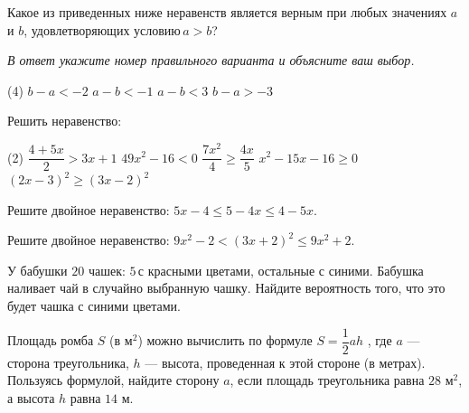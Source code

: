 %
%
\begin{homework}[number=2]
	\begin{listofex}
		\item Какое из приведенных ниже неравенств является верным при любых значениях \( a \) и \( b \), удовлетворяющих условию \( a > b \)?
		
		\textit{В ответ укажите номер правильного варианта и объясните ваш выбор.}
		\begin{tasks}(4)
			\task \( b-a < -2 \)
			\task \( a-b < -1 \)
			\task \( a-b < 3 \)
			\task \( b-a > -3 \)
		\end{tasks}
		\item Решить неравенство:
		\begin{tasks}(2)
			\task \( \dfrac{4+5x}{2}>3x+1 \)
			\task \( 49x^2-16<0 \)
			\task \( \dfrac{7x^2}{4}\ge\dfrac{4x}{5} \)
			\task \( x^2-15x-16\ge0 \)
			\task \( (2x-3)^2\ge(3x-2)^2 \)
		\end{tasks}
		\item Решите двойное неравенство: \( 5x-4\le5-4x\le4-5x \).
		\item Решите двойное неравенство: \( 9x^2-2<(3x+2)^2\le9x^2+2 \).
		\item У бабушки \( 20 \) чашек: \( 5 \) с красными цветами, остальные с синими. Бабушка наливает чай в случайно выбранную чашку. Найдите вероятность того, что это будет чашка с синими цветами.
		\item Площадь ромба \( S \) (в м\( ^2 \)) можно вычислить по формуле \( S=\dfrac{1}{2}ah \) , где \( a \) --- сторона треугольника, \( h \) --- высота, проведенная к этой стороне (в метрах). Пользуясь формулой, найдите сторону \( a \), если площадь треугольника равна \( 28 \) м\( ^2 \), а высота \( h \) равна \( 14 \) м.
	\end{listofex}
\end{homework}
%
